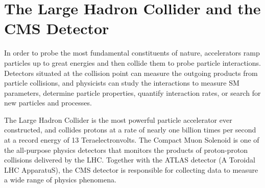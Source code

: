 \chapter{The Large Hadron Collider and the CMS Detector}
\label{ch:detector}

In order to probe the most fundamental constituents of nature, accelerators ramp particles up to great energies and then collide them to probe particle interactions. Detectors situated at the collision point can measure the outgoing products from particle collisions, and physicists can study the interactions to measure SM parameters, determine particle properties, quantify interaction rates, or search for new particles and processes.

The Large Hadron Collider is the most powerful particle accelerator ever constructed, and collides protons at a rate of nearly one billion times per second at a record energy of 13 Teraelectronvolts. The Compact Muon Solenoid is one of the all-purpose physics detectors that monitors the products of proton-proton collisions delivered by the LHC. Together with the ATLAS detector (A Toroidal LHC ApparatuS), the CMS detector is responsible for collecting data to measure a wide range of physics phenomena.





